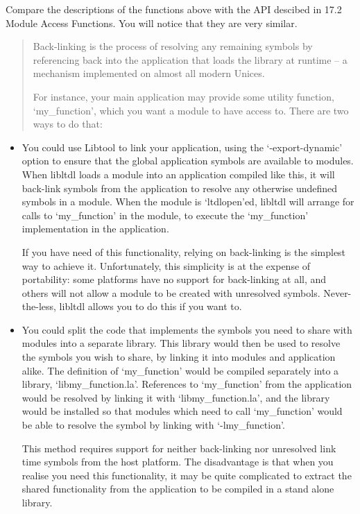 Compare the descriptions of the functions above with the API descibed in 17.2 Module Access Functions. You will notice that they are very similar. 

\begin{quote}
Back-linking is the process of resolving any remaining symbols by referencing back into the application that loads the library at runtime -- a mechanism implemented on almost all modern Unices.

For instance, your main application may provide some utility function, `my\_{}function', which you want a module to have access to. There are two ways to do that: 
\end{quote}

\begin{itemize}
\item You could use Libtool to link your application, using the `-export-dynamic' option to ensure that the global application symbols are available to modules. When libltdl loads a module into an application compiled like this, it will back-link symbols from the application to resolve any otherwise undefined symbols in a module. When the module is `ltdlopen'ed, libltdl will arrange for calls to `my\_{}function' in the module, to execute the `my\_{}function' implementation in the application.

      If you have need of this functionality, relying on back-linking is the simplest way to achieve it. Unfortunately, this simplicity is at the expense of portability: some platforms have no support for back-linking at all, and others will not allow a module to be created with unresolved symbols. Never-the-less, libltdl allows you to do this if you want to.

\item You could split the code that implements the symbols you need to share with modules into a separate library. This library would then be used to resolve the symbols you wish to share, by linking it into modules and application alike. The definition of `my\_{}function' would be compiled separately into a library, `libmy\_{}function.la'. References to `my\_{}function' from the application would be resolved by linking it with `libmy\_{}function.la', and the library would be installed so that modules which need to call `my\_{}function' would be able to resolve the symbol by linking with `-lmy\_{}function'.

      This method requires support for neither back-linking nor unresolved link time symbols from the host platform. The disadvantage is that when you realise you need this functionality, it may be quite complicated to extract the shared functionality from the application to be compiled in a stand alone library. 
\end{itemize}

